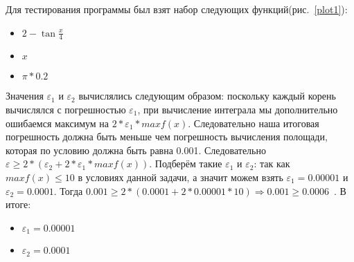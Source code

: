 \documentclass[a4paper,12pt,titlepage,finall]{article}
\begin{document}
Для тестирования программы был взят набор следующих функций(рис.~\ref{plot1}):
\begin{itemize}
  \item {$2-\tan{\frac{x}{4}}$}
  \item {$x$}
  \item {$\pi*0.2$}
\end{itemize}

Значения $\varepsilon_1$ и $\varepsilon_2$ вычислялись следующим образом: поскольку каждый корень вычислялся с погрешностью $\varepsilon_1$, при вычисление интеграла мы дополнительно ошибаемся максимум на $2*\varepsilon_1*max{f(x)}$. Следовательно наша итоговая погрешность должна быть меньше чем погрешность вычисления полощади, которая по условию должна быть равна 0.001. Следовательно $\varepsilon \geq 2*(\varepsilon_2 + 2*\varepsilon_1*max{f(x)})$. Подберём такие $\varepsilon_1$ и $\varepsilon_2$: так как $max{f(x)} \leq 10$ в условиях данной задачи, а значит можем взять $\varepsilon_1=0.00001$ и $\varepsilon_2=0.0001$. Тогда $0.001 \geq 2*(0.0001+2*0.00001*10) \Longrightarrow 0.001 \geq 0.0006$~\cite{math}. В итоге:
\begin{itemize}
  \item $\varepsilon_1=0.00001$
  \item $\varepsilon_2=0.0001$
\end{itemize}
\end{document}
